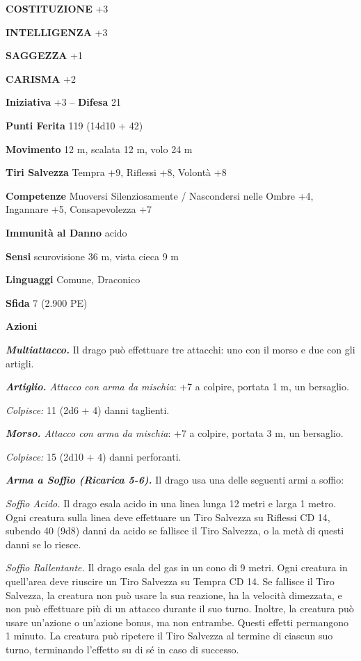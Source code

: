 \begin{multicols}{2}
\textbf{COSTITUZIONE} +3

\textbf{INTELLIGENZA} +3

\textbf{SAGGEZZA} +1

\textbf{CARISMA} +2

\textbf{Iniziativa} +3 -- \textbf{Difesa} 21

\textbf{Punti Ferita} 119 (14d10 + 42)

\textbf{Movimento} 12 m, scalata 12 m, volo 24 m

\textbf{Tiri Salvezza} Tempra +9, Riflessi +8, Volontà +8

\textbf{Competenze} Muoversi Silenziosamente / Nascondersi nelle Ombre +4, Ingannare +5, Consapevolezza +7

\textbf{Immunità al Danno} acido

\textbf{Sensi} scurovisione 36 m, vista cieca 9 m

\textbf{Linguaggi} Comune, Draconico

\textbf{Sfida} 7 (2.900 PE)

\textbf{Azioni}

\emph{\textbf{Multiattacco.}} Il drago può effettuare tre attacchi: uno con il morso e due con gli artigli.

\emph{\textbf{Artiglio.} Attacco con arma da mischia}: +7 a colpire, portata 1 m, un bersaglio.

\emph{Colpisce:} 11 (2d6 + 4) danni taglienti.

\emph{\textbf{Morso.} Attacco con arma da mischia}: +7 a colpire, portata 3 m, un bersaglio.

\emph{Colpisce:} 15 (2d10 + 4) danni perforanti.

\emph{\textbf{Arma a Soffio (Ricarica 5-6).}} Il drago usa una delle seguenti armi a soffio:

\emph{Soffio Acido.} Il drago esala acido in una linea lunga 12 metri e larga 1 metro. Ogni creatura sulla linea deve effettuare un Tiro Salvezza su Riflessi CD 14, subendo 40 (9d8) danni da acido se fallisce il Tiro Salvezza, o la metà di questi danni se lo riesce.

\emph{Soffio Rallentante.} Il drago esala del gas in un cono di 9 metri. Ogni creatura in quell'area deve riuscire un Tiro Salvezza su Tempra CD 14. Se fallisce il Tiro Salvezza, la creatura non può usare la sua reazione, ha la velocità dimezzata, e non può effettuare più di un attacco durante il suo turno. Inoltre, la creatura può usare un'azione o un'azione bonus, ma non entrambe. Questi effetti permangono 1 minuto. La creatura può ripetere il Tiro Salvezza al termine di ciascun suo turno, terminando l'effetto su di sé in caso di successo.


\end{multicols}
